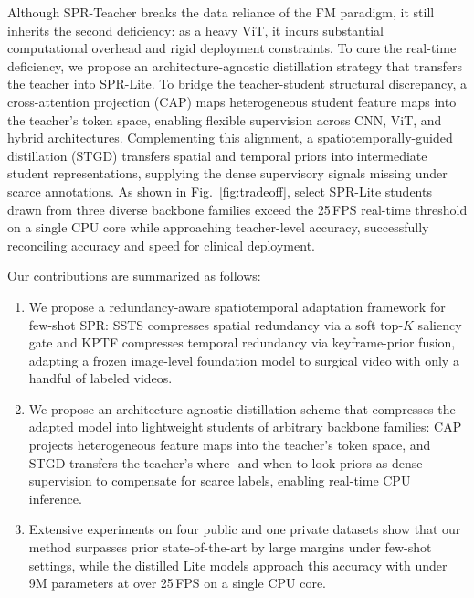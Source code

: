 Although SPR-Teacher breaks the data reliance of the FM paradigm, it still inherits the second deficiency: as a heavy ViT, it incurs substantial computational overhead and rigid deployment constraints. To cure the real-time deficiency, we propose an architecture-agnostic distillation strategy that transfers the teacher into SPR-Lite. To bridge the teacher-student structural discrepancy, a cross-attention projection (CAP) maps heterogeneous student feature maps into the teacher's token space, enabling flexible supervision across CNN, ViT, and hybrid architectures. Complementing this alignment, a spatiotemporally-guided distillation (STGD) transfers spatial and temporal priors into intermediate student representations, supplying the dense supervisory signals missing under scarce annotations. As shown in Fig.~\ref{fig:tradeoff}, select SPR-Lite students drawn from three diverse backbone families exceed the 25\,FPS real-time threshold on a single CPU core while approaching teacher-level accuracy, successfully reconciling accuracy and speed for clinical deployment.





Our contributions are summarized as follows:
\begin{enumerate}
    \item We propose a redundancy-aware spatiotemporal adaptation framework
    for few-shot SPR: SSTS compresses spatial redundancy via a soft top-$K$
    saliency gate and KPTF compresses temporal redundancy via keyframe-prior
    fusion, adapting a frozen image-level foundation model to surgical
    video with only a handful of labeled videos.
    \item We propose an architecture-agnostic distillation scheme that
    compresses the adapted model into lightweight students of arbitrary
    backbone families: CAP projects heterogeneous feature maps into the
    teacher's token space, and STGD transfers the teacher's where- and
    when-to-look priors as dense supervision to compensate for scarce
    labels, enabling real-time CPU inference.
    \item Extensive experiments on four public and one private datasets show
    that our method surpasses prior state-of-the-art by large margins under
    few-shot settings, while the distilled Lite models approach this accuracy
    with under 9M parameters at over 25\,FPS on a single CPU core.
\end{enumerate}


